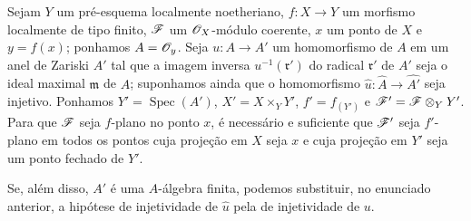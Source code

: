 \begin{corollary}[11.5.2]
\label{IV.11.5.2}
Sejam $Y$ um pré-esquema
localmente noetheriano,
$f:X\to Y$ um morfismo
localmente de tipo finito,
$\mathscr{F}$ um
$\mathscr{O}_X$-módulo coerente,
$x$ um ponto de $X$ e
$y=f(x)$; ponhamos
$A=\mathscr{O}_y$. Seja
$u:A\to A'$ um
homomorfismo de $A$ em
um anel de Zariski $A'$
tal que a imagem inversa
$u^{-1}(\mathfrak r')$ do
radical $\mathfrak r'$ de
$A'$ seja o ideal maximal
$\mathfrak m$ de $A$;
suponhamos ainda que o
homomorfismo
$\widehat u:\widehat A\to
\widehat{A'}$ seja
injetivo. Ponhamos
$Y'=\operatorname{Spec}(A')$,
$X'=X\times_Y Y'$,
$f'=f_{(Y')}$ e
$\mathscr{F}'=\mathscr{F}\otimes_Y Y'$.
Para que $\mathscr{F}$ seja
$f$-plano no ponto $x$,
é necessário e suficiente
que $\mathscr{F}'$ seja
$f'$-plano em todos os
pontos cuja projeção em
$X$ seja $x$ e cuja
projeção em $Y'$ seja um
ponto fechado de $Y'$.

Se, além disso, $A'$ é uma
$A$-álgebra finita,
podemos substituir, no
enunciado anterior, a
hipótese de injetividade
de $\widehat u$ pela de
injetividade de $u$.
\end{corollary}

